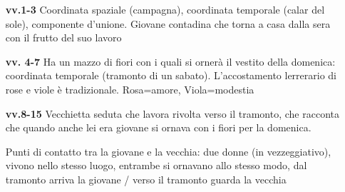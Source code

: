 \documentclass{article}
\begin{document}
\begin{multicols}{2}
    \columnbreak

    \noindent
    {\begin{itemize}
        \item[\textbf{vv.1-3}] Coordinata spaziale (campagna), coordinata temporale (calar del sole),
            componente d'unione. Giovane contadina che torna a casa dalla sera con il frutto del
            suo lavoro
        \item[\textbf{vv. 4-7}] Ha un mazzo di fiori con i quali si ornerà il vestito della
            domenica: coordinata temporale (tramonto di un sabato). L'accostamento lerrerario
            di rose e viole è tradizionale. Rosa=amore, Viola=modestia
        \item[\textbf{vv.8-15}] Vecchietta seduta che lavora rivolta verso il tramonto, che
            racconta che quando anche lei era giovane si ornava con i fiori per la domenica.

            Punti di contatto tra la giovane e la vecchia: due donne (in vezzeggiativo),
            vivono nello stesso luogo, entrambe si ornavano allo stesso modo, dal tramonto
            arriva la giovane / verso il tramonto guarda la vecchia


\end{itemize}}
\end{multicols}
\end{document}
